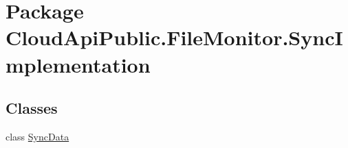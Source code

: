 \hypertarget{namespace_cloud_api_public_1_1_file_monitor_1_1_sync_implementation}{\section{Package Cloud\-Api\-Public.\-File\-Monitor.\-Sync\-Implementation}
\label{namespace_cloud_api_public_1_1_file_monitor_1_1_sync_implementation}
}
\subsection*{Classes}
\begin{DoxyCompactItemize}
\item 
class \hyperlink{class_cloud_api_public_1_1_file_monitor_1_1_sync_implementation_1_1_sync_data}{Sync\-Data}
\end{DoxyCompactItemize}
